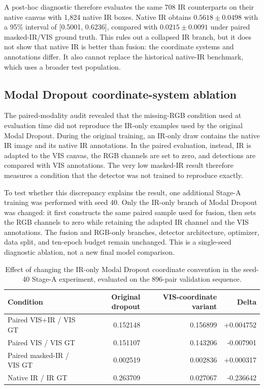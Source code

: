 A post-hoc diagnostic therefore evaluates the same 708 IR counterparts on
their native canvas with 1,824 native IR boxes. Native IR obtains
\(0.5618\pm0.0498\) \mapfifty{} with a 95\% interval of
[0.5001, 0.6236], compared with \(0.0215\pm0.0091\) under paired masked-IR/VIS
ground truth. This rules out a collapsed IR branch, but it does not show that
native IR is better than fusion: the coordinate systems and annotations differ.
It also cannot replace the historical native-IR benchmark, which uses a
broader test population.

\subsection{Modal Dropout coordinate-system ablation}

The paired-modality audit revealed that the missing-RGB condition used at
evaluation time did not reproduce the IR-only examples used by the original
Modal Dropout. During the original training, an IR-only draw contains the
native IR image and its native IR annotations. In the paired evaluation,
instead, IR is adapted to the VIS canvas, the RGB channels are set to zero, and
detections are compared with VIS annotations. The very low masked-IR result
therefore measures a condition that the detector was not trained to reproduce
exactly.

To test whether this discrepancy explains the result, one additional Stage-A
training was performed with seed 40. Only the IR-only branch of Modal Dropout
was changed: it first constructs the same paired sample used for fusion, then
sets the RGB channels to zero while retaining the adapted IR channel and the
VIS annotations. The fusion and RGB-only branches, detector architecture,
optimizer, data split, and ten-epoch budget remain unchanged. This is a
single-seed diagnostic ablation, not a new final model comparison.

\begin{table}[htbp]
  \centering
  \caption{Effect of changing the IR-only Modal Dropout coordinate convention
  in the seed-40 Stage-A experiment, evaluated on the 896-pair validation
  sequence.}
  \label{tab:paired-vis-dropout-probe}
  \begin{tabular}{lrrr}
    \toprule
    Condition & Original dropout & VIS-coordinate variant & Delta \\
    \midrule
    Paired VIS+IR / VIS GT & 0.152148 & 0.156899 & +0.004752 \\
    Paired VIS / VIS GT & 0.151107 & 0.143206 & -0.007901 \\
    Paired masked-IR / VIS GT & 0.002519 & 0.002836 & +0.000317 \\
    Native IR / IR GT & 0.263709 & 0.027067 & -0.236642 \\
    \bottomrule
  \end{tabular}
\end{table}

